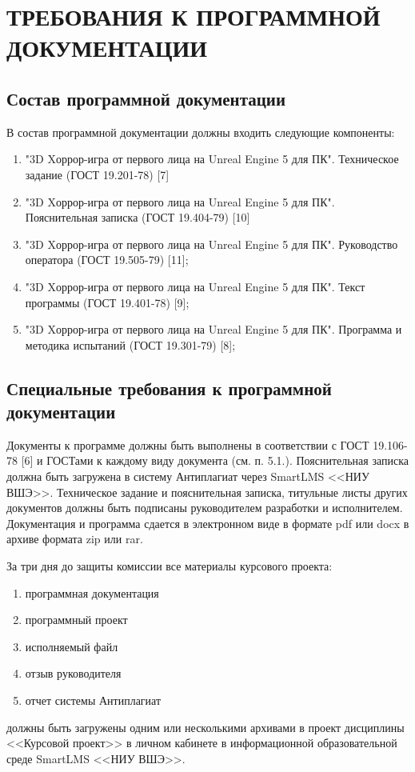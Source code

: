 \section{ТРЕБОВАНИЯ К ПРОГРАММНОЙ ДОКУМЕНТАЦИИ}

\subsection{Состав программной документации}

В состав программной документации должны входить следующие компоненты:
\begin{enumerate}
    \item "3D Xоррор-игра от первого лица на Unreal Engine 5 для ПК". Техническое задание (ГОСТ 19.201-78) [7]
    \item "3D Xоррор-игра от первого лица на Unreal Engine 5 для ПК". Пояснительная записка (ГОСТ 19.404-79) [10]
    \item "3D Xоррор-игра от первого лица на Unreal Engine 5 для ПК". Руководство оператора (ГОСТ 19.505-79) [11];
    \item "3D Xоррор-игра от первого лица на Unreal Engine 5 для ПК". Текст программы (ГОСТ 19.401-78) [9];
    \item "3D Xоррор-игра от первого лица на Unreal Engine 5 для ПК". Программа и методика испытаний (ГОСТ 19.301-79) [8];
\end{enumerate}


\subsection{Специальные требования к программной документации}

Документы к программе должны быть выполнены в соответствии с ГОСТ 19.106-78 [6] и ГОСТами к каждому виду документа (см. п. 5.1.).
Пояснительная записка должна быть загружена в систему Антиплагиат через SmartLMS <<НИУ ВШЭ>>.
Техническое задание и пояснительная записка, титульные листы других документов должны быть подписаны руководителем разработки и исполнителем. Документация и программа сдается в электронном виде в формате pdf или docx в архиве формата zip или rar.

За три дня до защиты комиссии все материалы курсового проекта:
\begin{enumerate}
    \item программная документация
    \item программный проект
    \item исполняемый файл
    \item отзыв руководителя
    \item отчет системы Антиплагиат
\end{enumerate}
должны быть загружены одним или несколькими архивами в проект дисциплины <<Курсовой проект>> в личном кабинете в информационной образовательной среде SmartLMS <<НИУ ВШЭ>>.
